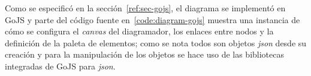 Como se especificó en la sección~\ref{ref:sec-gojs}, el diagrama se implementó en GoJS y parte del código fuente en~\ref{code:diagram-gojs} muestra una instancia de cómo se configura el \textit{canvas} del diagramador, los enlaces entre nodos y la definición de la paleta de elementos; como se nota todos son objetos \textit{json} desde su creación y para la manipulación de los objetos se hace uso de las bibliotecas integradas de GoJS para \textit{json}.

